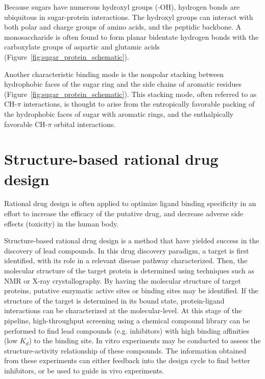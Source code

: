 Because sugars have numerous hydroxyl groups (-OH), hydrogen bonds are ubiquitous in sugar-protein interactions. The hydroxyl groups can interact with both polar and charge groups of amino acids, and the peptidic backbone.  A monosaccharide is often found to form planar bidentate hydrogen bonds with the carboxylate groups of aspartic and glutamic acids (Figure~\ref{fig:sugar_protein_schematic}).  
 
Another characteristic binding mode is the nonpolar stacking between hydrophobic faces of the sugar ring and the side chains of aromatic residues (Figure~\ref{fig:sugar_protein_schematic}).  This stacking mode, often referred to as CH-$\pi$ interactions, is thought to arise from the entropically favorable packing of the hydrophobic faces of sugar with aromatic rings, and the enthalpically favorable CH-$\pi$ orbital interactions.\cite{Laughrey:2008p6566} %

\section{Structure-based rational drug design}
Rational drug design is often applied to optimize ligand binding specificity in an effort to increase the efficacy of the putative drug, and decrease adverse side effects (toxicity) in the human body.

Structure-based rational drug design is a method that have yielded success in the discovery of lead compounds.
In this drug discovery paradigm, a target is first identified, with its role in a relevant disease pathway characterized. Then, the molecular structure of the target protein is determined using techniques such as NMR or X-ray crystallography.  By having the molecular structure of target proteins, putative enzymatic active sites or binding sites may be identified.  If the structure of the target is determined in its bound state, protein-ligand interactions can be characterized at the molecular-level. At this stage of the pipeline, high-throughput screening using a chemical compound library can be performed to find lead compounds (e.g. inhibitors) with high binding affinities (low $K_d$) to the binding site. In vitro experiments may be conducted to assess the structure-activity relationship of these compounds.  The information obtained from these experiments can either feedback into the design cycle to find better inhibitors, or be used to guide in vivo experiments.

